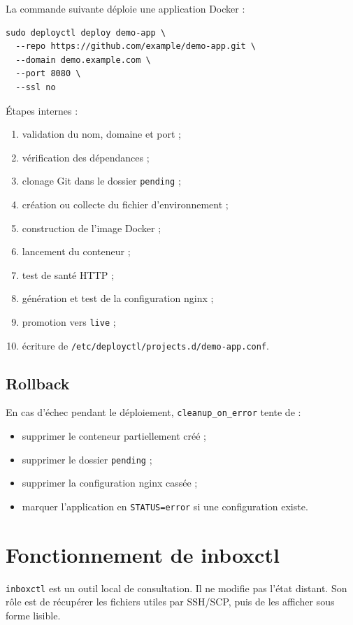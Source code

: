 \documentclass[12pt,a4paper]{article}
\begin{document}
La commande suivante déploie une application Docker :

\begin{lstlisting}
sudo deployctl deploy demo-app \
  --repo https://github.com/example/demo-app.git \
  --domain demo.example.com \
  --port 8080 \
  --ssl no
\end{lstlisting}

Étapes internes :
\begin{enumerate}[leftmargin=*]
  \item validation du nom, domaine et port ;
  \item vérification des dépendances ;
  \item clonage Git dans le dossier \texttt{pending} ;
  \item création ou collecte du fichier d'environnement ;
  \item construction de l'image Docker ;
  \item lancement du conteneur ;
  \item test de santé HTTP ;
  \item génération et test de la configuration nginx ;
  \item promotion vers \texttt{live} ;
  \item écriture de \texttt{/etc/deployctl/projects.d/demo-app.conf}.
\end{enumerate}

\subsection{Rollback}

En cas d'échec pendant le déploiement, \texttt{cleanup\_on\_error} tente de :
\begin{itemize}[leftmargin=*]
  \item supprimer le conteneur partiellement créé ;
  \item supprimer le dossier \texttt{pending} ;
  \item supprimer la configuration nginx cassée ;
  \item marquer l'application en \texttt{STATUS=error} si une configuration existe.
\end{itemize}

\section{Fonctionnement de inboxctl}

\texttt{inboxctl} est un outil local de consultation. Il ne modifie pas l'état distant. Son rôle est de récupérer les fichiers utiles par SSH/SCP, puis de les afficher sous forme lisible.
\end{document}
